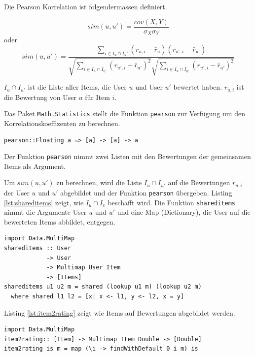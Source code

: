 \documentclass[a4paper, 12pt]{article}
\begin{document}
Die Pearson Korrelation ist folgendermassen definiert.

\begin{equation}
\label{eq:pearson1}
 sim(u,u') = \frac{cov(X,Y)}{\sigma_X \sigma_Y} 
\end{equation}
oder
\begin{equation}
  \label{eq:pearson}
  sim(u,u')  = \frac{\sum_{i \in I_u \cap I_u'}(r_{u,i} - \bar{r}_u)(r_{u',i} - \bar{r}_{u'})}{\sqrt{\sum_{i \in I_u \cap I_{u'}}( r_{u',i} - \bar{r}_{u'})^2}\sqrt{\sum_{i \in I_u \cap I_{u'}}( r_{u',i} - \bar{r}_{u'})^2}}
\end{equation}

$I_u \cap I_{u'}$ ist die Liste aller Items, die User $u$ und User $u'$ bewertet haben. $r_{u,i}$ ist die Bewertung von User $u$ für Item $i$. 


Das Paket \verb|Math.Statistics| stellt die Funktion \verb|pearson| zur Verfügung um den Korrelationskoeffizenten zu berechnen.
\begin{verbatim}
pearson::Floating a => [a] -> [a] -> a
\end{verbatim}
 Der Funktion \verb|pearson| nimmt zwei Listen mit den Bewertungen der gemeinsamen Items als Argument.

Um $sim(u,u')$ zu berechnen, wird die Liste $I_u \cap I_{u'}$ auf die Bewertungen $r_{u,i}$ der User $u$ und $u'$ abgebildet und der Funktion \verb|pearson| übergeben. Listing \ref{lst:shareditems} zeigt, wie $I_u \cap I_v$ beschafft wird. Die Funktion \verb|shareditems| nimmt die Argumente User $u$ und $u'$ und eine Map (Dictionary), die User auf die bewerteten Items abbildet, entgegen.

\begin{lstlisting}[caption=Implementierung der Abfrage von $I_u \cap I_{u'}$, label=lst:shareditems]
import Data.MultiMap
shareditems :: User 
            -> User 
            -> Multimap User Item 
            -> [Items]
shareditems u1 u2 m = shared (lookup u1 m) (lookup u2 m)
  where shared l1 l2 = [x| x <- l1, y <- l2, x = y]
\end{lstlisting}

Listing \ref{lst:item2rating} zeigt wie Items auf Bewertungen abgebildet werden. 

\begin{lstlisting}[caption=Implementierung: Abbildung Items zu Bewertungen, label=lst:item2rating]
import Data.MultiMap
item2rating:: [Item] -> Multimap Item Double -> [Double]
item2rating is m = map (\i -> findWithDefault 0 i m) is
\end{lstlisting}
\end{document}
